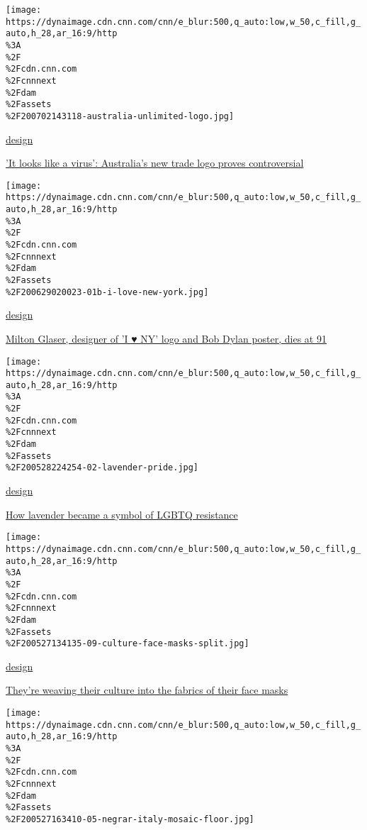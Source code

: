 \href{/style/article/australia-logo-design/index.html}{}

\texttt{[image: https://dynaimage.cdn.cnn.com/cnn/e\_blur:500,q\_auto:low,w\_50,c\_fill,g\_auto,h\_28,ar\_16:9/http\\\%3A\\\%2F\\\%2Fcdn.cnn.com\\\%2Fcnnnext\\\%2Fdam\\\%2Fassets\\\%2F200702143118-australia-unlimited-logo.jpg]}

\href{/style/design}{design}

\href{/style/article/australia-logo-design/index.html}{'It looks like a
virus': Australia's new trade logo proves controversial}

\href{/style/article/milton-glaser-obituary-designer-bob-dylan-logo-style-trnd/index.html}{}

\texttt{[image: https://dynaimage.cdn.cnn.com/cnn/e\_blur:500,q\_auto:low,w\_50,c\_fill,g\_auto,h\_28,ar\_16:9/http\\\%3A\\\%2F\\\%2Fcdn.cnn.com\\\%2Fcnnnext\\\%2Fdam\\\%2Fassets\\\%2F200629020023-01b-i-love-new-york.jpg]}

\href{/style/design}{design}

\href{/style/article/milton-glaser-obituary-designer-bob-dylan-logo-style-trnd/index.html}{Milton
Glaser, designer of 'I ♥ NY' logo and Bob Dylan poster, dies at 91}

\href{/style/article/lgbtq-lavender-symbolism-pride/index.html}{}

\texttt{[image: https://dynaimage.cdn.cnn.com/cnn/e\_blur:500,q\_auto:low,w\_50,c\_fill,g\_auto,h\_28,ar\_16:9/http\\\%3A\\\%2F\\\%2Fcdn.cnn.com\\\%2Fcnnnext\\\%2Fdam\\\%2Fassets\\\%2F200528224254-02-lavender-pride.jpg]}

\href{/style/design}{design}

\href{/style/article/lgbtq-lavender-symbolism-pride/index.html}{How
lavender became a symbol of LGBTQ resistance}

\href{/style/article/ethnic-group-culture-face-masks-trnd/index.html}{}

\texttt{[image: https://dynaimage.cdn.cnn.com/cnn/e\_blur:500,q\_auto:low,w\_50,c\_fill,g\_auto,h\_28,ar\_16:9/http\\\%3A\\\%2F\\\%2Fcdn.cnn.com\\\%2Fcnnnext\\\%2Fdam\\\%2Fassets\\\%2F200527134135-09-culture-face-masks-split.jpg]}

\href{/style/design}{design}

\href{/style/article/ethnic-group-culture-face-masks-trnd/index.html}{They're
weaving their culture into the fabrics of their face masks}

\href{/style/article/negrar-mosaic-floor-italy-discovery-scli-intl/index.html}{}

\texttt{[image: https://dynaimage.cdn.cnn.com/cnn/e\_blur:500,q\_auto:low,w\_50,c\_fill,g\_auto,h\_28,ar\_16:9/http\\\%3A\\\%2F\\\%2Fcdn.cnn.com\\\%2Fcnnnext\\\%2Fdam\\\%2Fassets\\\%2F200527163410-05-negrar-italy-mosaic-floor.jpg]}

